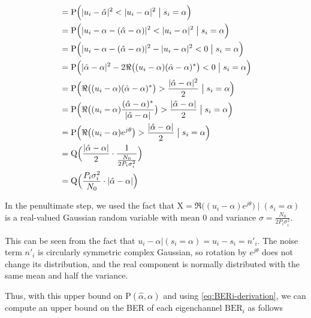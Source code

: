 \documentclass[a4paper,12pt]{article}
\begin{document}
\begin{align}
    &= \mathrm{P}\Big( |u_i - \hat{\alpha}|^2 < |u_i - \alpha|^2 \;\big|\; s_i = \alpha \Big) \notag \\
    &= \mathrm{P}\Big( |u_i - \alpha - (\hat{\alpha} - \alpha)|^2 < |u_i - \alpha|^2 \;\big|\; s_i = \alpha \Big) \notag \\
    &= \mathrm{P}\Big( |u_i - \alpha - (\hat{\alpha} - \alpha)|^2 - |u_i - \alpha|^2 < 0 \;\big|\; s_i = \alpha \Big) \notag \\
    &= \mathrm{P}\Big( |\hat{\alpha} - \alpha|^2 - 2 \Re \big((u_i - \alpha) (\hat{\alpha} - \alpha)^*\big) < 0 \;\big|\; s_i = \alpha \Big) \notag \\
    &= \mathrm{P}\Big( \Re \big((u_i - \alpha)  (\hat{\alpha} - \alpha)^*\big) > \frac{|\hat{\alpha} - \alpha|^2}{2} \;\big|\; s_i = \alpha \Big) \notag \\
    &= \mathrm{P}\Big( \Re \big((u_i - \alpha) \frac{(\hat{\alpha} - \alpha)^*}{|\hat{\alpha} - \alpha|}\big) > \frac{|\hat{\alpha} - \alpha|}{2} \;\big|\; s_i = \alpha \Big) \notag \\
    &= \mathrm{P}\Big( \Re \big((u_i - \alpha) e^{j \theta} \big) > \frac{|\hat{\alpha} - \alpha|}{2} \;\big|\; s_i = \alpha \Big) \notag \\
    &= \mathrm{Q} \Big(  \frac{|\hat{\alpha} - \alpha|}{2} \cdot \frac{1}{\frac{N_0}{2 P_i \sigma^{2}_i}} \Big) \notag \\
    &= \mathrm{Q} \Big(  \frac{P_i \sigma^{2}_i}{N_0} \cdot |\hat{\alpha} - \alpha| \Big) \label{eq:simplified-upper-bound}
\end{align}

\noindent In the penultimate step, we used the fact that $ \mathrm{X} = \Re \big((u_i - \alpha) e^{j \theta} \big) \;\big|\; (s_i = \alpha) $ is a real-valued Gaussian random variable with mean $ 0 $ and variance $ \sigma = \frac{N_0}{2 P_i \sigma^{2}_i} $. \smallskip

\noindent This can be seen from the fact that $ u_i - \alpha | (s_i = \alpha) = u_i - s_i = n'_i $. The noise term $ n'_i $ is circularly symmetric complex Gaussian, so rotation by $ e^{j \theta} $ does not change its distribution, and the real component is normally distributed with the same mean and half the variance. \bigskip

\noindent Thus, with this upper bound on $ \mathrm{P}(\hat{\alpha}, \alpha) $ and using \autoref{eq:BERi-derivation}, we can compute an upper bound on the BER of each eigenchannel $ \mathrm{BER}_i $ as follows
\end{document}
